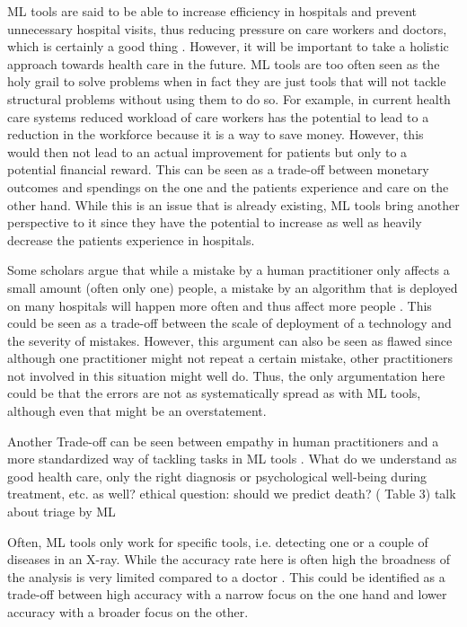 ML tools are said to be able to increase efficiency in hospitals and prevent unnecessary hospital visits, thus reducing pressure on care workers and doctors, which is certainly a good thing \cite{horgan2019artificial}. However, it will be important to take a holistic approach towards health care in the future. ML tools are too often seen as the holy grail to solve problems when in fact they are just tools that will not tackle structural problems without using them to do so. For example, in current health care systems reduced workload of care workers has the potential to lead to a reduction in the workforce because it is a way to save money. However, this would then not lead to an actual improvement for patients but only to a potential financial reward. This can be seen as a trade-off between monetary outcomes and spendings on the one  and the patients experience and care on the other hand. While this is an issue that is already existing, ML tools bring another perspective to it since they have the potential to increase as well as heavily decrease the patients experience in hospitals.


Some scholars argue that while a mistake by a human practitioner only affects a small amount (often only one) people, a mistake by an algorithm that is deployed on many hospitals will happen more often and thus affect more people \cite{Morley2020}. This could be seen as a trade-off between the scale of deployment of a technology and the severity of mistakes. However, this argument can also be seen as flawed since although one practitioner might not repeat a certain mistake, other practitioners not involved in this situation might well do. Thus, the only argumentation here could be that the errors are not as systematically spread as with ML tools, although even that might be an overstatement.


Another Trade-off can be seen between empathy in human practitioners and a more standardized way of tackling tasks in ML tools \cite{Morley2020}. What do we understand as good health care, only the right diagnosis or psychological well-being during treatment,  etc.  as well? 
ethical question: should we predict death? (\cite{topol2019high} Table 3) \cite{he2019practical} talk about triage by ML


Often, ML tools only work for specific tools, i.e. detecting one or a couple of diseases in an X-ray. While the accuracy rate here is often high the broadness of the analysis is very limited compared to a doctor \cite{topol2019high}. This could be identified as a trade-off between high accuracy with a narrow focus on the one hand and lower accuracy with a broader focus on the other.


